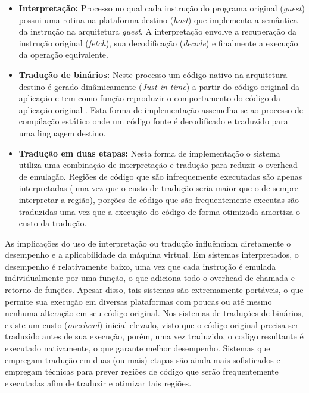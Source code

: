 \documentclass[11pt,twoside]{article}
\begin{document}
\begin{itemize}
  \item \textbf{Interpretação:} Processo no qual cada instrução do programa original (\emph{guest}) possui 
  uma rotina na plataforma destino (\emph{host}) que implementa a semântica da instrução na arquitetura \emph{guest}. 
  A interpretação envolve a recuperação da instrução original (\emph{fetch}), sua decodificação (\emph{decode}) 
  e finalmente a execução da operação equivalente.
 
  \item \textbf{Tradução de binários:} Neste processo um código nativo na arquitetura destino é gerado 
  dinâmicamente (\emph{Just-in-time}) a partir do código original da aplicação e tem como função reproduzir o 
  comportamento do código da aplicação original \cite{Sites1993}. Esta forma de implementação assemelha-se ao
  processo de compilação estático onde um código fonte é decodificado e traduzido para uma linguagem destino.
 
  \item \textbf{Tradução em duas etapas:} Nesta forma de implementação o sistema utiliza uma combinação de interpretação e tradução para
  reduzir o overhead de emulação. Regiões de código que são infrequemente executadas são apenas interpretadas
  (uma vez que o custo de tradução seria maior que o de sempre interpretar a região), porções de código que são 
  frequentemente executas são traduzidas uma vez que a execução do código de forma otimizada amortiza o custo da
  tradução.
\end{itemize}

As implicações do uso de interpretação ou tradução influênciam diretamente o desempenho e a aplicabilidade da 
máquina virtual. Em sistemas interpretados, o desempenho é relativamente baixo, uma vez que cada instrução é 
emulada individualmente por uma função, o que adiciona todo o overhead de chamada e retorno de funções. Apesar 
disso, tais sistemas são extremamente portáveis, o que permite sua execução em diversas plataformas com poucas 
ou até mesmo nenhuma alteração em seu código original. Nos sistemas de traduções de binários, existe um custo 
(\emph{overhead}) inicial elevado, visto que o código original precisa ser traduzido antes de sua execução, 
porém, uma vez traduzido, o codigo resultante é executado nativamente, o que garante melhor desempenho. Sistemas
que empregam tradução em duas (ou mais) etapas são ainda mais sofisticados e empregam técnicas para prever 
regiões de código que serão frequentemente executadas afim de traduzir e otimizar tais regiões.
\end{document}
